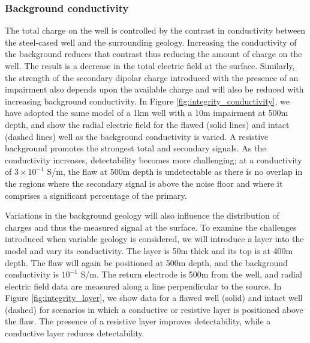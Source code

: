 

\subsubsection{Background conductivity}

The total charge on the well is controlled by the contrast in conductivity between the steel-cased well and the surrounding geology. Increasing the conductivity of the background reduces that contrast thus reducing the amount of charge on the well. The result is a decrease in the total electric field at the surface. Similarly, the strength of the secondary dipolar charge introduced with the presence of an impairment also depends upon the available charge and will also be reduced with increasing background conductivity. In Figure \ref{fig:integrity_conductivity}, we have adopted the same model of a 1km well with a 10m impairment at 500m depth, and show the radial electric field for the flawed (solid lines) and intact (dashed lines) well as the background conductivity is varied. A resistive background promotes the strongest total and secondary signals. As the conductivity increases, detectability becomes more challenging; at a conductivity of $3 \times 10^{-1}$ S/m, the flaw at 500m depth is undetectable as there is no overlap in the regions where the secondary signal is above the noise floor and where it comprises a significant percentage of the primary.




Variations in the background geology will also influence the distribution of charges and thus the measured signal at the surface. To examine the challenges introduced when variable geology is considered, we will introduce a layer into the model and vary its conductivity. The layer is 50m thick and its top is at 400m depth. The flaw will again be positioned at 500m depth, and the background conductivity is $10^{-1}$ S/m. The return electrode is 500m from the well, and radial electric field data are measured along a line perpendicular to the source. In Figure \ref{fig:integrity_layer}, we show data for a flawed well (solid) and intact well (dashed) for scenarios in which a conductive or resistive layer is positioned above the flaw. The presence of a resistive layer improves detectability, while a conductive layer reduces detectability.



